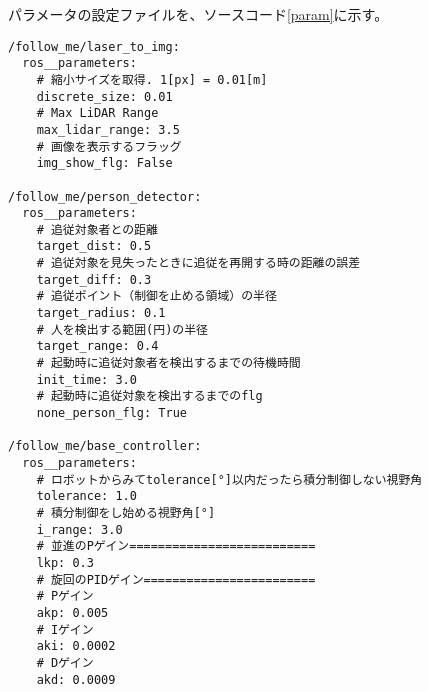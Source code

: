 パラメータの設定ファイルを、ソースコード\ref{param}に示す。
\begin{lstlisting}[caption=follow\_me\_params.yaml, label=param]
/follow_me/laser_to_img:
  ros__parameters:
    # 縮小サイズを取得. 1[px] = 0.01[m]
    discrete_size: 0.01
    # Max LiDAR Range
    max_lidar_range: 3.5
    # 画像を表示するフラッグ
    img_show_flg: False

/follow_me/person_detector:
  ros__parameters:
    # 追従対象者との距離
    target_dist: 0.5
    # 追従対象を見失ったときに追従を再開する時の距離の誤差
    target_diff: 0.3
    # 追従ポイント（制御を止める領域）の半径
    target_radius: 0.1
    # 人を検出する範囲(円)の半径
    target_range: 0.4
    # 起動時に追従対象者を検出するまでの待機時間
    init_time: 3.0
    # 起動時に追従対象を検出するまでのflg
    none_person_flg: True
  
/follow_me/base_controller:
  ros__parameters:
    # ロボットからみてtolerance[°]以内だったら積分制御しない視野角
    tolerance: 1.0
    # 積分制御をし始める視野角[°]
    i_range: 3.0
    # 並進のPゲイン==========================
    lkp: 0.3
    # 旋回のPIDゲイン========================
    # Pゲイン
    akp: 0.005
    # Iゲイン
    aki: 0.0002
    # Dゲイン
    akd: 0.0009
\end{lstlisting}

